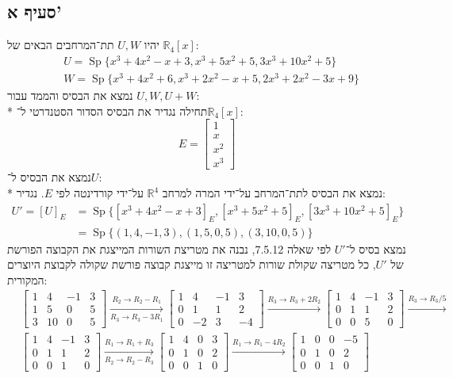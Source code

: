 \documentclass[a4paper]{article}
\DeclareMathOperator\Sp{Sp}
\def\RR{\mathbb{R}}
\begin{document}
\subsection{סעיף א'}
יהיו $U, W$ תת־המרחבים הבאים של $\RR_4[x]$:
\begin{align*}
	& U = \Sp\{ x^3 + 4x^2 - x + 3,
	x^3 + 5x^2 + 5,
	3x^3 + 10x^2 + 5 \} \\
	& W = \Sp\{ x^3 + 4x^2 + 6,
	x^3 + 2x^2 - x + 5,
	2x^3 + 2x^2 - 3x + 9\}
\end{align*}
נמצא את הבסיס והממד עבור $U, W, U + W$: \\*
תחילה נגדיר את הבסיס הסדור הסטנדרטי ל־$\RR_4[x]$:
\[
	E = \begin{bmatrix}
		1 \\
		x \\
		x^2 \\
		x^3
	\end{bmatrix}
\]
נמצא את הבסיס ל־$U$: \\*
נמצא את הבסיס לתת־המרחב על־ידי המרה למרחב $\RR^4$ על־ידי
קורדינטה לפי $E$. נגדיר:
\begin{align*}
	U' = {[U]}_E
	& = \Sp\{ {[x^3 + 4x^2 - x + 3]}_E,
	{[x^3 + 5x^2 + 5]}_E,
	{[3x^3 + 10x^2 + 5]}_E \} \\
	& = \Sp\{ (1, 4, -1, 3),
	(1, 5, 0, 5),
	(3, 10, 0, 5) \}
\end{align*}
נמצא בסיס ל־$U'$ לפי שאלה 7.5.12, נבנה את מטריצת השורות המייצגת את הקבוצה
הפורשת של $U'$, כל מטריצה שקולת שורות למטריצה זו מייצגת קבוצה פורשת שקולה
לקבוצת היוצרים המקורית:
\begin{align*}
	& \begin{bmatrix}
		1 & 4 & -1 & 3 \\
		1 & 5 & 0 & 5 \\
		3 & 10 & 0 & 5
	\end{bmatrix}
	\xrightarrow[R_3 \to R_3 - 3R_1]{R_2 \to R_2 - R_1}
	\begin{bmatrix}
		1 & 4 & -1 & 3 \\
		0 & 1 & 1 & 2 \\
		0 & -2 & 3 & -4
	\end{bmatrix}
	\xrightarrow{R_3 \to R_3 + 2R_2}
	\begin{bmatrix}
		1 & 4 & -1 & 3 \\
		0 & 1 & 1 & 2 \\
		0 & 0 & 5 & 0
	\end{bmatrix}
	\xrightarrow{R_3 \to R_3 / 5} \\
	& \begin{bmatrix}
		1 & 4 & -1 & 3 \\
		0 & 1 & 1 & 2 \\
		0 & 0 & 1 & 0
	\end{bmatrix}
	\xrightarrow[R_2 \to R_2 - R_3]{R_1 \to R_1 + R_3}
	\begin{bmatrix}
		1 & 4 & 0 & 3 \\
		0 & 1 & 0 & 2 \\
		0 & 0 & 1 & 0
	\end{bmatrix}
	\xrightarrow{R_1 \to R_1 - 4R_2}
	\begin{bmatrix}
		1 & 0 & 0 & -5 \\
		0 & 1 & 0 & 2 \\
		0 & 0 & 1 & 0
	\end{bmatrix}
\end{align*}
\end{document}
